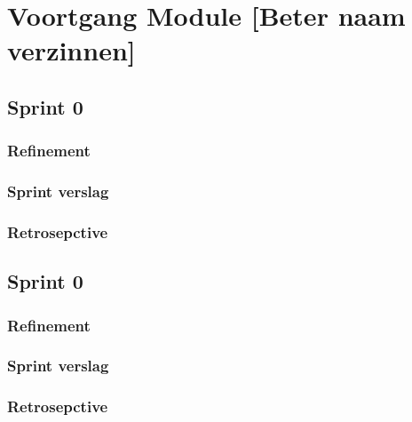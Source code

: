 
\chapter{Voortgang Module [Beter naam verzinnen]}
\section{Sprint 0}
\lipsum[01]
\subsection{Refinement}
\lipsum[01]
\subsection{Sprint verslag}
\lipsum[01]
\subsection{Retrosepctive}
\lipsum[01]

\section{Sprint 0}
\lipsum[01]
\subsection{Refinement}
\lipsum[01]
\subsection{Sprint verslag}
\lipsum[01]
\subsection{Retrosepctive}
